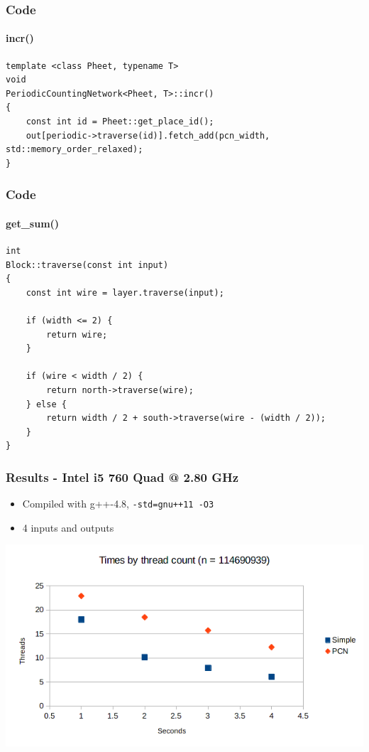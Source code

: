 \documentclass[notes=show]{beamer}
\begin{document}
\begin{frame}[fragile]
\frametitle{Code}
\framesubtitle{incr()}
\begin{lstlisting}
template <class Pheet, typename T>
void
PeriodicCountingNetwork<Pheet, T>::incr()
{
    const int id = Pheet::get_place_id();
    out[periodic->traverse(id)].fetch_add(pcn_width, std::memory_order_relaxed);
}
\end{lstlisting}
\end{frame}

\begin{frame}[fragile]
\frametitle{Code}
\framesubtitle{get\_sum()}
\begin{lstlisting}
int
Block::traverse(const int input)
{
    const int wire = layer.traverse(input);

    if (width <= 2) {
        return wire;
    }

    if (wire < width / 2) {
        return north->traverse(wire);
    } else {
        return width / 2 + south->traverse(wire - (width / 2));
    }
}
\end{lstlisting}
\end{frame}

\begin{frame}
\frametitle{Results - Intel i5 760 Quad @ 2.80 GHz}

\begin{itemize}
\item Compiled with g++-4.8, \lstinline|-std=gnu++11 -O3|
\item 4 inputs and outputs
\end{itemize}

\includegraphics[width=\textwidth]{core_i5}
\end{frame}
\end{document}

